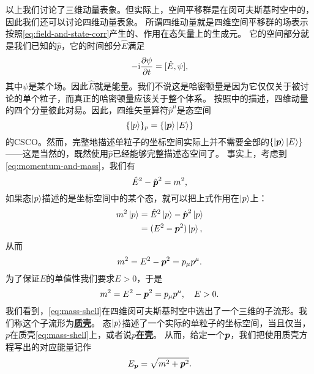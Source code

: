 \documentclass[hyperref, UTF8, a4paper]{ctexart}
\newcommand*{\ii}{\mathrm{i}}
\renewcommand{\autoref}{\prettyref}
\newcommand{\concept}[1]{\underline{\textbf{#1}}}
\begin{document}
以上我们讨论了三维动量表象。但实际上，空间平移群是在闵可夫斯基时空中的，因此我们还可以讨论四维动量表象。
所谓四维动量就是四维空间平移群的场表示按照\eqref{eq:field-and-state-corr}产生的、作用在态矢量上的生成元。
它的空间部分就是我们已知的$\hat{p}$，它的时间部分$\hat{E}$满足
\[
    - \ii \pdv{\psi}{t} = [\hat{E}, \psi],
\]
其中$\psi$是某个场。因此$\hat{E}$就是能量。我们不说这是哈密顿量是因为它仅仅关于被讨论的单个粒子，而真正的哈密顿量应该关于整个体系。
按照\autoref{sec:translation}中的描述，四维动量的四个分量彼此对易。因此，四维矢量算符$\hat{p}^\mu$是态空间
\[
    \{\ket{p}\}_p = \{\ket{\vb*{p}} \ket{E}\}
\]
的CSCO。然而，完整地描述单粒子的坐标空间实际上并不需要全部的$\{\ket{\vb*{p}} \ket{E}\}$——这是当然的，既然使用$\hat{p}$已经能够完整描述态空间了。
事实上，考虑到\eqref{eq:momentum-and-mass}，我们有
\begin{equation}
    \hat{E}^2 - \hat{\vb*{p}}^2 = m^2,
\end{equation}
如果态$\ket{p}$描述的是坐标空间中的某个态，就可以把上式作用在$\ket{p}$上：
\[
    \begin{aligned}
        m^2 \ket{p} &= \hat{E}^2 \ket{p} - \hat{\vb*{p}}^2 \ket{p} \\
        &= (E^2 - \vb*{p}^2) \ket{p},
    \end{aligned}
\]
从而
\[
    m^2 = E^2 - \vb*{p}^2 = p_\mu p^\mu.
\]
为了保证$E$的单值性我们要求$E>0$，于是
\begin{equation}
    m^2 = E^2 - \vb*{p}^2 = p_\mu p^\mu, \quad E > 0.
    \label{eq:mass-shell}
\end{equation}
我们看到，\eqref{eq:mass-shell}在四维闵可夫斯基时空中选出了一个三维的子流形。我们称这个子流形为\concept{质壳}。
态$\ket{p}$描述了一个实际的单粒子的坐标空间，当且仅当，$p$在质壳\eqref{eq:mass-shell}上，或者说$p$\concept{在壳}。
从而，给定一个$\vb*{p}$，我们把使用质壳方程写出的对应能量记作
\begin{equation}
    E_{\vb*{p}} = \sqrt{ m^2 + \vb*{p}^2 }.
\end{equation}
\end{document}
